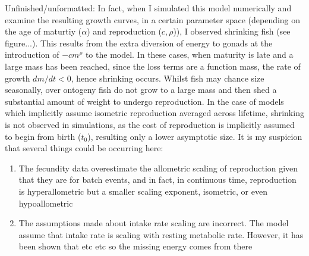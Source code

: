 \documentclass[a4paper]{article} %
\begin{document}
        Unfinished/unformatted:
        In fact, when I simulated this model numerically and examine the resulting growth curves, in a certain parameter space (depending on the age of maturtiy ($\alpha$) and reproduction ($c, \rho$)), I observed shrinking fish (see figure...). This results from the extra diversion of energy to gonads at the introduction of $- cm^\rho$ to the model. In these cases, when maturity is late and a large mass has been reached, since the loss terms are a function mass, the rate of growth $dm/dt < 0$, hence shrinking occurs. Whilst fish may chance size seasonally, over ontogeny fish do not grow to a large mass and then shed a substantial amount of weight to undergo reproduction. In the case of models which implicitly assume isometric reproduction averaged across lifetime, shrinking is not observed in simulations, as the cost of reproduction is implicitly assumed to begin from birth ($t_0$), resulting only a lower asymptotic size. It is my suspicion that several things could be occurring here:
            \begin{enumerate}
                \item The fecundity data \autocite{Barneche2018d} overestimate the allometric scaling of reproduction given that they are for batch events, and in fact, in continuous time, reproduction is hyperallometric but a smaller scaling exponent, isometric, or even hypoallometric
                \item The assumptions made about intake rate scaling are incorrect. The \cite{West2001} model assume that intake rate is scaling with resting metabolic rate. However, it has been shown that \autocite{Pawar2012} etc etc so the missing energy comes from there
            \end{enumerate}
        
\end{document}
